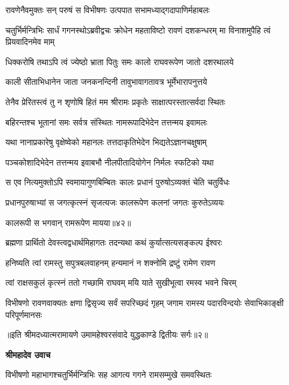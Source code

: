 \twolineshloka
{रावणेनैवमुक्तः सन् परुषं स विभीषणः}
{उत्पपात सभामध्याद्गदापाणिर्महाबलः} %

\threelineshloka
{चतुर्भिर्मन्त्रिभिः सार्धं गगनस्थोऽब्रवीद्वचः}
{क्रोधेन महताविष्टो रावणं दशकन्धरम्}
{मा विनाशमुपैहि त्वं प्रियवादिनमेव माम्} %

\twolineshloka
{धिक्करोषि तथाऽपि त्वं ज्येष्ठो भ्राता पितुः समः}
{कालो राघवरूपेण जातो दशरथालये} %

\twolineshloka
{काली सीताभिधानेन जाता जनकनन्दिनी}
{तावुभावागतावत्र भूर्मेभारापनुत्तये} %

\twolineshloka
{तेनैव प्रेरितस्त्वं तु न शृणोषि हितं मम}
{श्रीरामः प्रकृतेः साक्षात्परस्तात्सर्वदा स्थितः} %

\twolineshloka
{बहिरन्तश्च भूतानां समः सर्वत्र संस्थितः}
{नामरूपादिभेदेन तत्तन्मय इवामलः} %

\twolineshloka
{यथा नानाप्रकारेषु वृक्षेष्वेको महानलः}
{तत्तदाकृतिभेदेन भिद्यतेऽज्ञानचक्षुषाम्} %

\twolineshloka
{पञ्चकोशादिभेदेन तत्तन्मय इवाबभौ}
{नीलपीतादियोगेन निर्मलः स्फटिको यथा} %

\twolineshloka
{स एव नित्यमुक्तोऽपि स्वमायागुणबिम्बितः}
{कालः प्रधानं पुरुषोऽव्यक्तं चेति चतुर्विधः} %

\twolineshloka
{प्रधानपुरुषाभ्यां स जगत्कृत्स्नं सृजत्यजः}
{कालरूपेण कलनां जगतः कुरुतेऽव्ययः} %

{कालरूपी स भगवान् रामरूपेण मायया॥४२॥} %


\twolineshloka
{ब्रह्मणा प्रार्थितो देवस्त्वद्वधार्थमिहागतः}
{तदन्यथा कथं कुर्यात्सत्यसङ्कल्प ईश्वरः} %

\twolineshloka
{हनिष्यति त्वां रामस्तु सपुत्रबलवाहनम्}
{हन्यमानं न शक्नोमि द्रष्टुं रामेण रावण} %

\twolineshloka
{त्वां राक्षसकुलं कृत्स्नं ततो गच्छामि राघवम्}
{मयि याते सुखीभूत्वा रमस्व भवने चिरम्} %

\fourlineindentedshloka
{विभीषणो रावणवाक्यतः क्षणा\-}
{द्विसृज्य सर्वं सपरिच्छदं गृहम्}
{जगाम रामस्य पदारविन्दयोः}
{सेवाभिकाङ्क्षी परिपूर्णमानसः} %

{॥इति श्रीमदध्यात्मरामायणे उमामहेश्वरसंवादे युद्धकाण्डे द्वितीयः
सर्गः॥२॥
}




\textbf{श्रीमहादेव उवाच}

\twolineshloka
{विभीषणो महाभागश्चतुर्भिर्मन्त्रिभिः सह}
{आगत्य गगने रामसम्मुखे समवस्थितः} %

